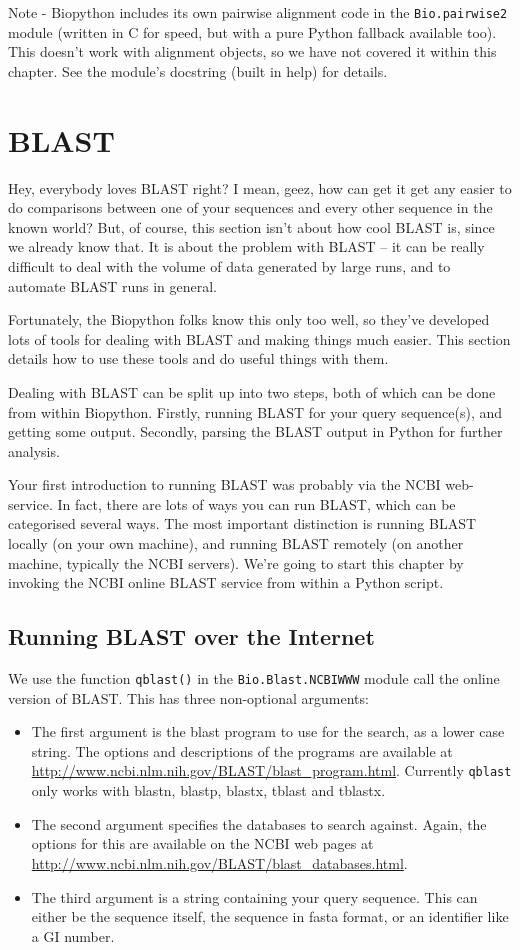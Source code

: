 \documentclass{report}
\begin{document}
Note - Biopython includes its own pairwise alignment code in the \verb|Bio.pairwise2|
module (written in C for speed, but with a pure Python fallback available too). This
doesn't work with alignment objects, so we have not covered it within this chapter.
See the module's docstring (built in help) for details.


\chapter{BLAST}
\label{chapter:blast}
Hey, everybody loves BLAST right? I mean, geez, how can get it get any easier to do comparisons between one of your sequences and every other sequence in the known world? But, of course, this section isn't about how cool BLAST is, since we already know that. It is about the problem with BLAST -- it can be really difficult to deal with the volume of data generated by large runs, and to automate BLAST runs in general.

Fortunately, the Biopython folks know this only too well, so they've developed lots of tools for dealing with BLAST and making things much easier. This section details how to use these tools and do useful things with them.

Dealing with BLAST can be split up into two steps, both of which can be done from within Biopython.
Firstly, running BLAST for your query sequence(s), and getting some output.
Secondly, parsing the BLAST output in Python for further analysis.

Your first introduction to running BLAST was probably via the NCBI web-service.
In fact, there are lots of ways you can run BLAST, which can be categorised several ways.
The most important distinction is running BLAST locally (on your own machine),
and running BLAST remotely (on another machine, typically the NCBI servers).
We're going to start this chapter by invoking the NCBI online BLAST service
from within a Python script.

\section{Running BLAST over the Internet}
\label{sec:running-www-blast}

We use the function \verb|qblast()| in the \verb|Bio.Blast.NCBIWWW| module
call the online version of BLAST.  This has three non-optional arguments:
\begin{itemize}
\item The first argument is the blast program to use for the search, as a
lower case string. The options and descriptions of the programs are
available at \url{http://www.ncbi.nlm.nih.gov/BLAST/blast_program.html}.
Currently \verb|qblast| only works with blastn, blastp, blastx, tblast
and tblastx.
\item The second argument specifies the databases to search against. Again,
the options for this are available on the NCBI web pages at
\url{http://www.ncbi.nlm.nih.gov/BLAST/blast_databases.html}.
\item The third argument is a string containing your query sequence.  This
can either be the sequence itself, the sequence in fasta format,
or an identifier like a GI number.
\end{itemize}
\end{document}
